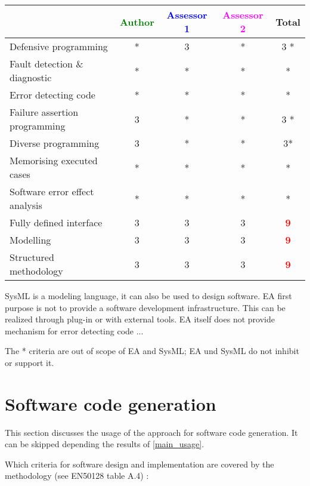 \begin{tabular}{|l | c | c | c | c|}
\hline
& \textcolor{green}{Author} & \textcolor{blue}{Assessor 1} & \textcolor{magenta}{Assessor 2} & Total \\
\hline
Defensive programming  &* & 3    & *& 3   * \\
\hline 
Fault detection \& diagnostic  &* & *& *& * \\
\hline
Error detecting code  &* & *& *& * \\
\hline
Failure assertion programming &3 & *& *& 3   * \\
\hline
Diverse programming &3 & *& *&  3* \\
\hline
Memorising executed cases &* & *&* & * \\
\hline
Software error effect analysis &* & *&* & * \\
\hline
Fully defined interface &3 & 3    & 3   & \textcolor{red}{\textbf{9}} \\
\hline
Modelling  &3 & 3   & 3   & \textcolor{red}{\textbf{9}} \\
\hline
Structured methodology &3 & 3   & 3   & \textcolor{red}{\textbf{9}} \\
\hline
\end{tabular}
\begin{author_comment}
SysML is a modeling language, it can also be used to design
software. EA first purpose is not to provide a software development
infrastructure. This can be realized through plug-in or with external
tools.
EA itself does not provide mechanism for error detecting code ...
\end{author_comment}

\begin{assessor1}
The * criteria are out of scope of EA and SysML; EA und SysML do not inhibit or support it.
\end{assessor1}

\section{Software code generation}
This section discusses the usage of the approach for software code generation.
It can be skipped depending the results of \ref{main_usage}.

Which criteria for software design and implementation are covered by the methodology
(see EN50128 table A.4) :


